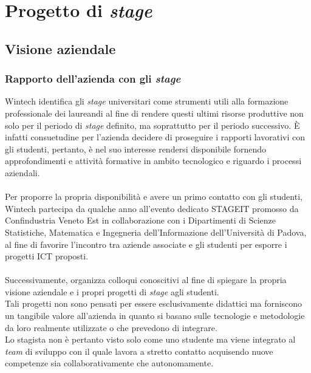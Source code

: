 \chapter{Progetto di \emph{stage}}
\label{cap:progettoDiStage}

\section{Visione aziendale}
\subsection{Rapporto dell'azienda con gli \emph{stage}}
Wintech identifica gli \emph{stage} universitari come strumenti utili alla formazione professionale dei laureandi al fine di rendere questi ultimi risorse produttive non solo per il periodo di \emph{stage} definito, ma soprattutto per il periodo successivo. È infatti consuetudine per l'azienda decidere di proseguire i rapporti lavorativi con gli studenti, pertanto, è nel suo interesse rendersi disponibile fornendo approfondimenti e attività formative in ambito tecnologico e riguardo i processi aziendali.\\\\
Per proporre la propria disponibilità e avere un primo contatto con gli studenti, Wintech partecipa da qualche anno all'evento dedicato STAGEIT promosso da Confindustria Veneto Est in collaborazione con i Dipartimenti di Scienze Statistiche, Matematica e Ingegneria dell'Informazione dell'Università di Padova, al fine di favorire l'incontro tra aziende associate e gli studenti per esporre i progetti \gls{ICT} proposti.\\\\
Successivamente, organizza colloqui conoscitivi al fine di spiegare la propria visione aziendale e i propri progetti di \emph{stage} agli studenti.\\
Tali progetti non sono pensati per essere esclusivamente didattici ma forniscono un tangibile valore all'azienda in quanto si basano sulle tecnologie e metodologie da loro realmente utilizzate o che prevedono di integrare.\\
Lo stagista non è pertanto visto solo come uno studente ma viene integrato al \emph{team} di sviluppo con il quale lavora a stretto contatto acquisendo nuove competenze sia collaborativamente che autonomamente.\\

